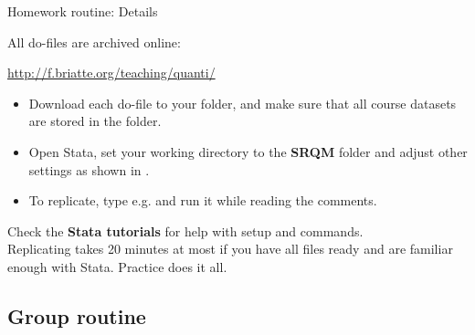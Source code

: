 \documentclass{beamer}
\begin{document}
	\begin{frame}[t]{Homework routine: Details}
	
		All do-files are archived online:\vspace{.5em}
							
		\url{http://f.briatte.org/teaching/quanti/}

		\begin{itemize}
			\item Download each do-file to your  folder, and make sure that all course datasets are stored in the  folder.
			
			\item Open Stata, set your working directory to the \textbf{SRQM} folder and adjust other settings as shown in .
			
			\item To replicate, type e.g.  and run it while reading the comments.
		\end{itemize}
		
		Check the \textbf{Stata tutorials} for help with setup and commands.\\[.5em]
		
		Replicating takes 20 minutes at most if you have all files ready and are familiar enough with Stata. Practice does it all.

	\end{frame}

	\subsection{Group routine}
	
\end{document}
